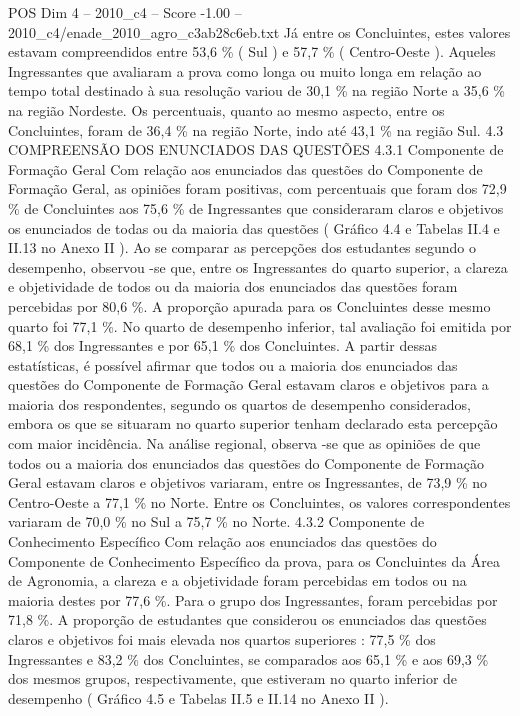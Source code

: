\begin{textsample}{POS Dim 4 – 2010\_c4 – Score -1.00 – 2010\_c4/enade\_2010\_agro\_c3ab28c6eb.txt}
Já entre os Concluintes, estes valores estavam compreendidos entre 53,6 \% ( Sul ) e 57,7 \% ( Centro-Oeste ).
Aqueles Ingressantes que avaliaram a prova como longa ou muito longa em relação ao tempo total destinado à sua resolução variou de 30,1 \% na região Norte a 35,6 \% na região Nordeste.
Os percentuais, quanto ao mesmo aspecto, entre os Concluintes, foram de 36,4 \% na região Norte, indo até 43,1 \% na região Sul. 4.3 COMPREENSÃO DOS ENUNCIADOS DAS QUESTÕES 4.3.1 Componente de Formação Geral Com relação aos enunciados das questões do Componente de Formação Geral, as opiniões foram positivas, com percentuais que foram dos 72,9 \% de Concluintes aos 75,6 \% de Ingressantes que consideraram claros e objetivos os enunciados de todas ou da maioria das questões ( Gráfico 4.4 e Tabelas II.4 e II.13 no Anexo II ).
Ao se comparar as percepções dos estudantes segundo o desempenho, observou -se que, entre os Ingressantes do quarto superior, a clareza e objetividade de todos ou da maioria dos enunciados das questões foram percebidas por 80,6 \%.
A proporção apurada para os Concluintes desse mesmo quarto foi 77,1 \%.
No quarto de desempenho inferior, tal avaliação foi emitida por 68,1 \% dos Ingressantes e por 65,1 \% dos Concluintes.
A partir dessas estatísticas, é possível afirmar que todos ou a maioria dos enunciados das questões do Componente de Formação Geral estavam claros e objetivos para a maioria dos respondentes, segundo os quartos de desempenho considerados, embora os que se situaram no quarto superior tenham declarado esta percepção com maior incidência.
Na análise regional, observa -se que as opiniões de que todos ou a maioria dos enunciados das questões do Componente de Formação Geral estavam claros e objetivos variaram, entre os Ingressantes, de 73,9 \% no Centro-Oeste a 77,1 \% no Norte.
Entre os Concluintes, os valores correspondentes variaram de 70,0 \% no Sul a 75,7 \% no Norte. 4.3.2 Componente de Conhecimento Específico Com relação aos enunciados das questões do Componente de Conhecimento Específico da prova, para os Concluintes da Área de Agronomia, a clareza e a objetividade foram percebidas em todos ou na maioria destes por 77,6 \%.
Para o grupo dos Ingressantes, foram percebidas por 71,8 \%.
A proporção de estudantes que considerou os enunciados das questões claros e objetivos foi mais elevada nos quartos superiores : 77,5 \% dos Ingressantes e 83,2 \% dos Concluintes, se comparados aos 65,1 \% e aos 69,3 \% dos mesmos grupos, respectivamente, que estiveram no quarto inferior de desempenho ( Gráfico 4.5 e Tabelas II.5 e II.14 no Anexo II ).

\end{textsample}
